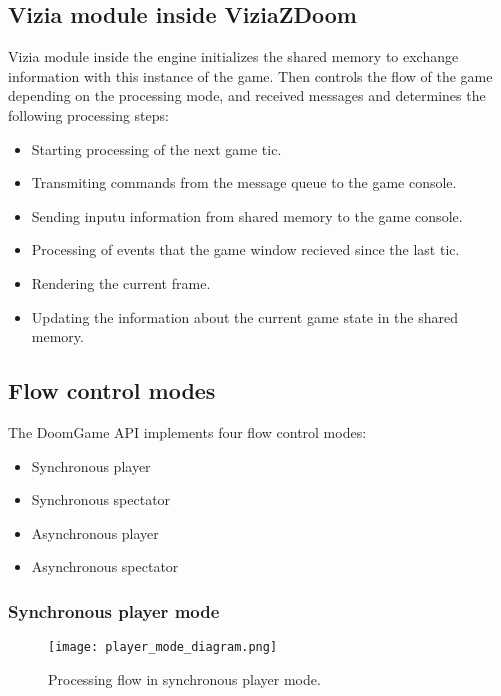 \subsection{Vizia module inside ViziaZDoom}\label{sec:architecture_inside_viziazdoom}

Vizia module inside the engine initializes the shared memory to exchange information with this instance of the game. Then controls the flow of the game depending on the processing mode, and received messages and determines the following processing steps:

    \begin{itemize}
    \item Starting processing of the next game tic.
    \item Transmiting commands from the message queue to the game console.
    \item Sending inputu information from shared memory to the game console.
    \item Processing of events that the game window recieved since the last tic.
    \item Rendering the current frame.
    \item Updating the information about the current game state in the shared memory.
    \end{itemize}

\subsection{Flow control modes}\label{sec:architecture_modes}

The DoomGame API implements four flow control modes:
    
    \begin{itemize}
    \item Synchronous player
    \item Synchronous spectator
    \item Asynchronous player
    \item Asynchronous spectator
    \end{itemize}
    
    \subsubsection{Synchronous player mode}\label{sec:architecture_player_mode}
    
        \begin{figure}
			    \centering
			    \texttt{[image: player\_mode\_diagram.png]}
			    \caption{Processing flow in synchronous player mode.}\label{fig:player_mode_diagram}
	    \end{figure}
        
